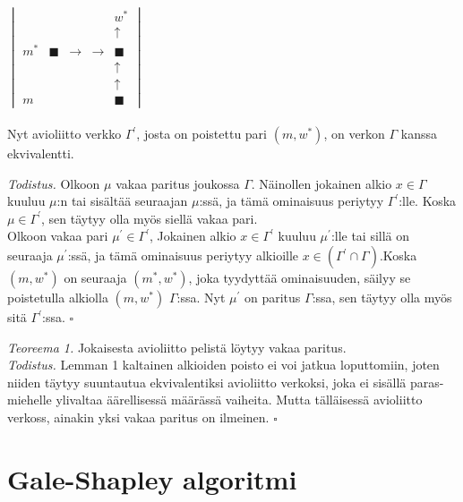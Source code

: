 \documentclass[finnish]{tktltiki2}
\theoremstyle{definition}
\theoremstyle{remark}
\begin{document}
$\begin{vmatrix}
  & & & & w^{*}
  \\
  & & & & \uparrow
  \\
  m^{*} & \blacksquare & \rightarrow & \rightarrow & \blacksquare
  \\
  & & & & \uparrow
  \\
  & & & & \uparrow
  \\
  m& & & & \blacksquare
\end{vmatrix}$
\\
\\
Nyt avioliitto verkko $\Gamma^{'}$, josta on poistettu pari $(m, w^{*})$, on verkon $\Gamma$ kanssa ekvivalentti.

\emph{Todistus.} Olkoon $\mu$ vakaa paritus joukossa $\Gamma$. Näinollen jokainen alkio $x \in \Gamma$ kuuluu $\mu$:n tai sisältää seuraajan $\mu$:ssä, ja tämä ominaisuus periytyy $\Gamma^{'}$:lle. Koska $\mu \in \Gamma^{'}$, sen täytyy olla myös siellä vakaa pari.
\\
Olkoon vakaa pari $\mu^{'} \in \Gamma^{'}$,  Jokainen alkio $x \in \Gamma^{'}$ kuuluu $\mu^{'}$:lle tai sillä on seuraaja $\mu^{'}$:ssä, ja tämä ominaisuus periytyy alkioille $x \in (\Gamma^{'} \cap \Gamma)$.Koska $(m, w^{*})$ on seuraaja $(m^{*}, w^{*})$, joka tyydyttää ominaisuuden, säilyy se poistetulla alkiolla $(m, w^{*})$ $\Gamma$:ssa. Nyt $\mu^{'}$ on paritus $\Gamma$:ssa, sen täytyy olla myös sitä $\Gamma^{'}$:ssa. $\square$ \cite[p. 579]{Balinski}

\emph{Teoreema 1.} Jokaisesta avioliitto pelistä löytyy vakaa paritus.
\\
\emph{Todistus.} Lemman 1 kaltainen alkioiden poisto ei voi jatkua loputtomiin, joten niiden täytyy suuntautua ekvivalentiksi avioliitto verkoksi, joka ei sisällä paras-miehelle ylivaltaa äärellisessä määrässä vaiheita. Mutta tälläisessä avioliitto verkoss, ainakin yksi vakaa paritus on ilmeinen. $\square$ \cite[p. 580]{Balinski}

\section{Gale-Shapley algoritmi}




%
%
 
%

%


\lastpage
\end{document}
